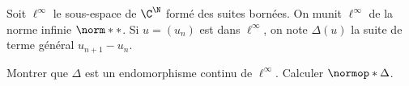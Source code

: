 \begin{enonce}
\begin{exercise}[ID={RMS 122-2 E1231 (TPE)},subtitle={},tags={}, difficulty={0}]
  Soit $\ell^\infty$ le sous-espace de $\C^{\N}$ formé des suites bornées.
  On munit $\ell^\infty$ de la norme infinie $\norm**$.
  Si $u=\left( u_n \right)$ est dans $\ell^\infty$, on note $\Delta(u)$ la suite de terme général $u_{n+1}-u_n$.

  Montrer que $\Delta$ est un endomorphisme continu de $\ell^\infty$.
  Calculer $\normop*\Delta$.
\end{exercise}
\begin{solution}
\end{solution}
\end{enonce}
